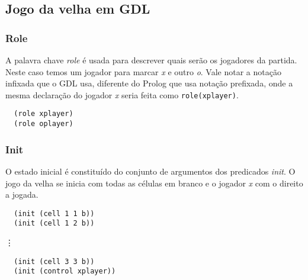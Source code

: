 \subsection{Jogo da velha em GDL}
\subsubsection*{Role}
A palavra chave \textit{role} é usada para descrever quais serão os jogadores da partida. Neste caso temos um jogador para marcar \textit{x} e outro \textit{o}. Vale notar a notação infixada que o GDL usa, diferente do Prolog que usa notação prefixada, onde a mesma declaração do jogador \textit{x} seria feita como \texttt{role(xplayer)}.
\begin{verbatim}                                                                                         
  (role xplayer)                                                                                         
  (role oplayer)                                                                                         
\end{verbatim}

\subsubsection*{Init}
O estado inicial é constituído do conjunto de argumentos dos predicados \textit{init}. O jogo da velha se inicia com todas as células em branco e o jogador \textit{x} com o direito a jogada.
\begin{verbatim}                                                                                         
  (init (cell 1 1 b))                                                                                    
  (init (cell 1 2 b))                                                                                    
\end{verbatim}
	\hspace{1.5cm} {\LARGE{ \vdots }}
\begin{verbatim}	
  (init (cell 3 3 b))                                                                                    
  (init (control xplayer))                                                                               
\end{verbatim}

